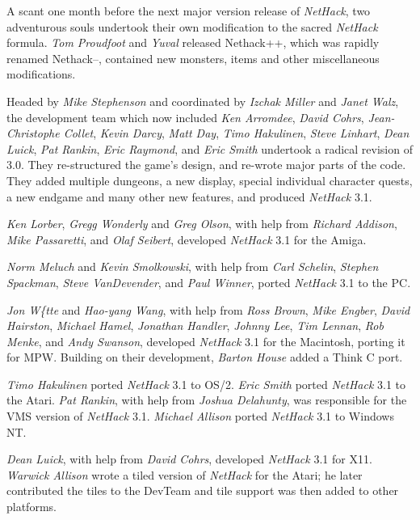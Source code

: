A scant one month before the next major version release of {\it NetHack}, two
adventurous souls undertook their own modification to the sacred {\it NetHack\/}
formula. {\it Tom Proudfoot\/} and {\it Yuval\/} released Nethack++,  which was
rapidly renamed Nethack--,  contained new monsters,  items and
other miscellaneous modifications.

Headed by {\it Mike Stephenson\/} and coordinated by {\it Izchak Miller\/} and
{\it Janet Walz}, the development team which now included {\it Ken Arromdee},
{\it David Cohrs}, {\it Jean-Christophe Collet}, {\it Kevin Darcy},
{\it Matt Day}, {\it Timo Hakulinen}, {\it Steve Linhart}, {\it Dean Luick},
{\it Pat Rankin}, {\it Eric Raymond}, and {\it Eric Smith\/} undertook a radical
revision of 3.0.  They re-structured the game's design, and re-wrote major
parts of the code.  They added multiple dungeons, a new display, special
individual character quests, a new endgame and many other new features, and
produced {\it NetHack\/} 3.1.

{\it Ken Lorber}, {\it Gregg Wonderly\/} and {\it Greg Olson}, with help
from {\it Richard Addison}, {\it Mike Passaretti}, and {\it Olaf Seibert},
developed {\it NetHack\/} 3.1 for the Amiga.

{\it Norm Meluch\/} and {\it Kevin Smolkowski}, with help from
{\it Carl Schelin}, {\it Stephen Spackman}, {\it Steve VanDevender},
and {\it Paul Winner}, ported {\it NetHack\/} 3.1 to the PC.

{\it Jon W\{tte\/} and {\it Hao-yang Wang}, with help from {\it Ross Brown},
{\it Mike Engber}, {\it David Hairston}, {\it Michael Hamel},
{\it Jonathan Handler}, {\it Johnny Lee}, {\it Tim Lennan}, {\it Rob Menke},
and {\it Andy Swanson}, developed {\it NetHack\/} 3.1 for the Macintosh,
porting it for MPW.  Building on their development, {\it Barton House\/}
added a Think C port.

{\it Timo Hakulinen\/} ported {\it NetHack\/} 3.1 to OS/2.  {\it Eric Smith\/}
ported {\it NetHack\/} 3.1 to the Atari.  {\it Pat Rankin}, with help from
{\it Joshua Delahunty}, was responsible for the VMS version of {\it NetHack\/} 3.1.
{\it Michael Allison\/} ported {\it NetHack\/} 3.1 to Windows NT.

{\it Dean Luick}, with help from {\it David Cohrs}, developed {\it NetHack\/}
3.1 for X11.
{\it Warwick Allison\/} wrote a tiled version of {\it NetHack\/} for the Atari;
he later contributed the tiles to the DevTeam and tile support was
then added to other platforms.

